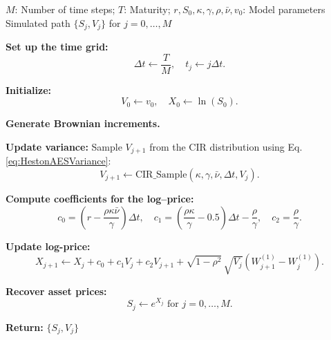 \documentclass[]{interact}
\theoremstyle{plain}%
\theoremstyle{definition}
\theoremstyle{remark}
\begin{document}
\begin{algorithm}[H]
\caption{AES Scheme for Heston Model}
\label{alg:AES}
\begin{algorithmic}[1]

\Require $M$: Number of time steps; $T$: Maturity; $r, S_0, \kappa, \gamma, \rho, \bar{\nu}, v_0$: Model parameters
\Ensure Simulated path $\{S_j, V_j\}$ for $j=0,\dots,M$

\vspace{0.5em}

\State \textbf{Set up the time grid:}
\[
  \Delta t \gets \frac{T}{M}, \quad t_j \gets j \Delta t.
\]

\State \textbf{Initialize:} 
\[
  V_0 \gets v_0, \quad X_0 \gets \ln(S_0).
\]

\State \textbf{Generate Brownian increments.}

   \State \textbf{Update variance:} 
   Sample $V_{j+1}$ from the CIR distribution using Eq. \eqref{eq:HestonAESVariance}:
   \[
     V_{j+1} \gets \text{CIR\_Sample}(\kappa,\gamma,\bar{\nu},\Delta t,V_j).
   \]

   \State \textbf{Compute coefficients for the log--price:}
   \[
     c_0 = \left(r - \frac{\rho \kappa \bar{\nu}}{\gamma}\right)\Delta t,\quad
     c_1 = \left(\frac{\rho \kappa}{\gamma}-0.5\right)\Delta t - \frac{\rho}{\gamma},\quad
     c_2 = \frac{\rho}{\gamma}.
   \]

   \State \textbf{Update log-price:}
   \[
     X_{j+1} \gets X_j 
     + c_0 
     + c_1 V_j 
     + c_2 V_{j+1}
     + \sqrt{1-\rho^2}\,\sqrt{V_j}(W^{(1)}_{j+1}-W^{(1)}_{j}).
   \]
\EndFor

\State \textbf{Recover asset prices:}
\[
  S_j \gets e^{X_j} \text{ for } j=0,\dots,M.
\]

\State \textbf{Return:} $\{S_j, V_j\}$

\end{algorithmic}
\end{algorithm}
\end{document}
